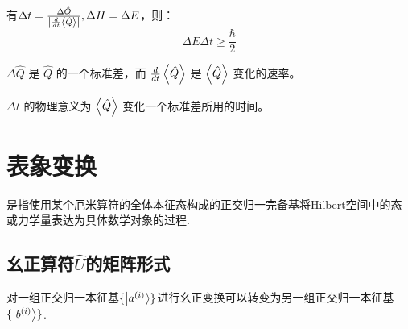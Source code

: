 有$\Delta t = \frac{\Delta \hat{Q}}{\left| \frac{d}{dt} \ev{\hat{Q}} \right|},\Delta H=\Delta E$，则：
$$\Delta E \Delta t \ge \frac{\hbar}{2}$$

$\Delta \hat{Q}$ 是 $\hat{Q}$ 的一个标准差，而 $\frac{d}{dt} \ev{\hat{Q}}$ 是 $\ev{\hat{Q}}$ 变化的速率。

$\Delta t$ 的物理意义为 $\ev{\hat{Q}}$ 变化一个标准差所用的时间。


\section{表象变换}
\begin{definition}
    是指使用某个厄米算符的全体本征态构成的正交归一完备基将Hilbert空间中的态或力学量表达为具体数学对象的过程.
\end{definition}
\subsection{幺正算符\texorpdfstring{$\hat{U}$}{U}的矩阵形式}
对一组正交归一本征基$\{\ket{a^{(i)}}\}$进行幺正变换可以转变为另一组正交归一本征基$\{\ket{b^{(i)}}\}$.


